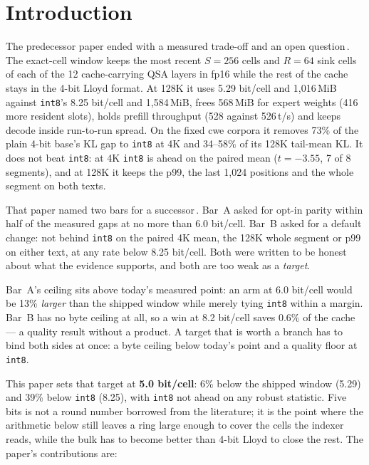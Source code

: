 \documentclass[10pt,twocolumn]{article}
\begin{document}
\section{Introduction}

The predecessor paper ended with a measured trade-off and an open question\,\cite{kvwin}. The exact-cell window keeps the most recent $S{=}256$ cells and $R{=}64$ sink cells of each of the 12 cache-carrying QSA layers in fp16 while the rest of the cache stays in the 4-bit Lloyd format. At 128K it uses 5.29 bit/cell and 1,016\,MiB against \texttt{int8}'s 8.25 bit/cell and 1,584\,MiB, frees 568\,MiB for expert weights (416 more resident slots), holds prefill throughput (528 against 526\,t/s) and keeps decode inside run-to-run spread. On the fixed cwe corpora it removes 73\% of the plain 4-bit base's KL gap to \texttt{int8} at 4K and 34--58\% of its 128K tail-mean KL. It does not beat \texttt{int8}: at 4K \texttt{int8} is ahead on the paired mean ($t{=}-3.55$, 7 of 8 segments), and at 128K it keeps the p99, the last 1,024 positions and the whole segment on both texts.

That paper named two bars for a successor\,\cite{kvwin}. Bar~A asked for opt-in parity within half of the measured gaps at no more than 6.0 bit/cell. Bar~B asked for a default change: not behind \texttt{int8} on the paired 4K mean, the 128K whole segment or p99 on either text, at any rate below 8.25 bit/cell. Both were written to be honest about what the evidence supports, and both are too weak as a \emph{target}.

Bar~A's ceiling sits above today's measured point: an arm at 6.0 bit/cell would be 13\% \emph{larger} than the shipped window while merely tying \texttt{int8} within a margin. Bar~B has no byte ceiling at all, so a win at 8.2 bit/cell saves 0.6\% of the cache --- a quality result without a product. A target that is worth a branch has to bind both sides at once: a byte ceiling below today's point and a quality floor at \texttt{int8}.

This paper sets that target at \textbf{5.0 bit/cell}: 6\% below the shipped window (5.29) and 39\% below \texttt{int8} (8.25), with \texttt{int8} not ahead on any robust statistic. Five bits is not a round number borrowed from the literature; it is the point where the arithmetic below still leaves a ring large enough to cover the cells the indexer reads, while the bulk has to become better than 4-bit Lloyd to close the rest. The paper's contributions are:
\end{document}

